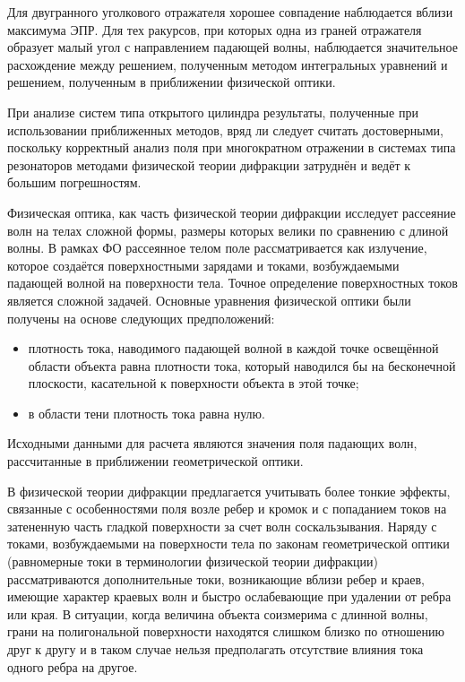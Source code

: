 Для двугранного уголкового отражателя хорошее совпадение наблюдается вблизи максимума ЭПР.
Для тех ракурсов, при которых одна из граней отражателя образует малый угол с направлением
падающей волны, наблюдается значительное расхождение между решением, полученным методом
интегральных уравнений и решением, полученным в приближении физической оптики.

При анализе систем типа открытого цилиндра результаты, полученные при использовании
приближенных методов, вряд ли следует считать достоверными, поскольку корректный анализ
поля при многократном отражении в системах типа резонаторов методами физической теории
дифракции затруднён и ведёт к большим погрешностям.

Физическая оптика, как часть физической теории дифракции исследует рассеяние волн на телах
сложной формы, размеры которых велики по сравнению с длиной волны. В рамках ФО рассеянное
телом поле рассматривается как излучение, которое создаётся поверхностными зарядами и
токами, возбуждаемыми падающей волной на поверхности тела.
Точное определение поверхностных токов является сложной задачей. Основные уравнения
физической оптики были получены на основе следующих предположений:
\begin{itemize}
    \item плотность тока, наводимого падающей волной в каждой точке освещённой области
    объекта равна плотности тока, который наводился бы на бесконечной плоскости,
    касательной к поверхности объекта в этой точке;
    \item в области тени плотность тока равна нулю.
\end{itemize}

Исходными данными для расчета являются значения поля падающих волн, рассчитанные в приближении геометрической оптики.

В физической теории дифракции предлагается учитывать более тонкие эффекты, связанные с
особенностями поля возле ребер и кромок и с попаданием токов на затененную часть гладкой
поверхности за счет волн соскальзывания.
Наряду с токами, возбуждаемыми на поверхности тела по законам геометрической оптики
(равномерные токи в терминологии физической теории дифракции) рассматриваются
дополнительные токи, возникающие вблизи ребер и краев, имеющие характер краевых волн и
быстро ослабевающие при удалении от ребра или края. В ситуации, когда величина объекта соизмерима с длинной волны, грани на полигональной поверхности находятся слишком близко по отношению друг к другу и в таком случае нельзя предполагать отсутствие влияния тока одного ребра на другое.

